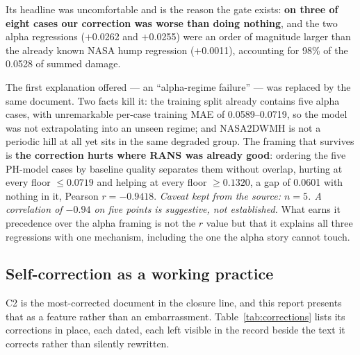 \documentclass[11pt,a4paper]{article}
\newcommand{\breakus}{\textunderscore\allowbreak}
\newcommand{\code}[1]{{\small\ttfamily\let\_\breakus #1}}
\begin{document}
Its headline was uncomfortable and is the reason the gate exists: \textbf{on three of eight
cases our correction was worse than doing nothing}, and the two \code{alpha\_05}
regressions ($+$0.0262 and $+$0.0255) were an order of magnitude larger than the already
known NASA hump regression ($+$0.0011), accounting for 98\% of the 0.0528 of summed damage.

The first explanation offered --- an ``alpha-regime failure'' --- was replaced by the same
document. Two facts kill it: the training split already contains five \code{alpha\_05}
cases, with unremarkable per-case training MAE of 0.0589--0.0719, so the model was not
extrapolating into an unseen regime; and \code{NASA\_2DWMH} is not a periodic hill at all
yet sits in the same degraded group. The framing that survives is
\textbf{the correction hurts where RANS was already good}: ordering the five PH-model cases
by baseline quality separates them without overlap, hurting at every floor $\leq 0.0719$
and helping at every floor $\geq 0.1320$, a gap of 0.0601 with nothing in it, Pearson
$r = -0.9418$. \emph{Caveat kept from the source: $n = 5$. A correlation of $-0.94$ on five
points is suggestive, not established.} What earns it precedence over the alpha framing is
not the $r$ value but that it explains all three regressions with one mechanism, including
the one the alpha story cannot touch.

\subsection{Self-correction as a working practice}

C2 is the most-corrected document in the closure line, and this report presents that as a
feature rather than an embarrassment. Table~\ref{tab:corrections} lists its corrections in
place, each dated, each left visible in the record beside the text it corrects rather than
silently rewritten.
\end{document}
